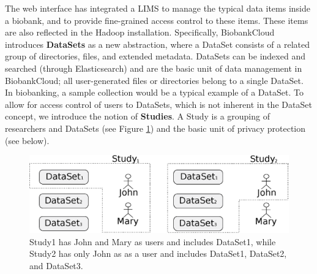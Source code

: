 The web interface has integrated a LIMS to manage the typical data items inside a biobank, and to provide fine-grained access control to these items. These items are also reflected in the Hadoop installation. Specifically, 
BiobankCloud introduces \textbf{DataSets} as a new abstraction, where a DataSet consists of a related group of directories, files, and extended metadata. DataSets can be indexed and searched (through Elasticsearch) and are the basic unit of data management in BiobankCloud; all user-generated files or directories belong to a single DataSet. In biobanking, a sample collection would be a typical example of a DataSet. To allow for access control of users to DataSets, which is not inherent in the DataSet concept, we introduce the notion of \textbf{Studies}. A Study is a grouping of researchers and DataSets (see Figure \ref{fig:studies}) and the basic unit of privacy protection (see below). 

\begin{figure}[h]
 \centering
 \includegraphics[scale=0.4]{./imgs/projects-as-groupings1.eps}
\caption{Study1 has John and Mary as users and includes DataSet1, while Study2 has only John as as a user and includes DataSet1, DataSet2, and DataSet3.}
\label{fig:studies}
\end{figure}


